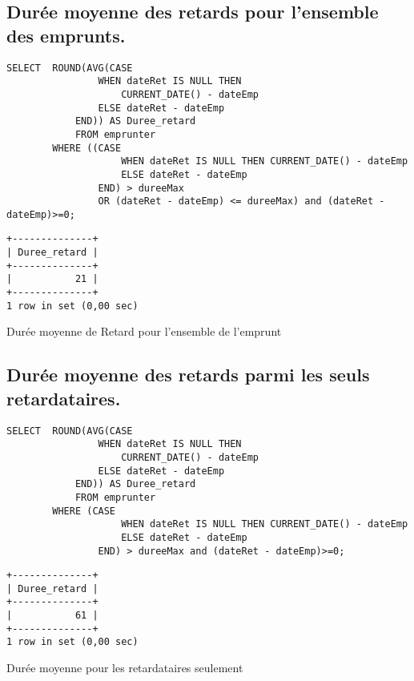 \documentclass{article}
\begin{document}
\subsection{Durée moyenne des retards pour l’ensemble des emprunts.}
\begin{listing}[H]
\begin{verbatim}
SELECT	ROUND(AVG(CASE
				WHEN dateRet IS NULL THEN
					CURRENT_DATE() - dateEmp
				ELSE dateRet - dateEmp
			END)) AS Duree_retard
			FROM emprunter     
		WHERE ((CASE
					WHEN dateRet IS NULL THEN CURRENT_DATE() - dateEmp
					ELSE dateRet - dateEmp
				END) > dureeMax
				OR (dateRet - dateEmp) <= dureeMax) and (dateRet - dateEmp)>=0;
\end{verbatim}
\begin{verbatim}
+--------------+
| Duree_retard |
+--------------+
|           21 |
+--------------+
1 row in set (0,00 sec)
\end{verbatim}
\caption{Durée moyenne de Retard pour l'ensemble de l'emprunt}
\end{listing}
\subsection{Durée moyenne des retards parmi les seuls retardataires.}
\begin{listing}[H]
\begin{verbatim}
SELECT	ROUND(AVG(CASE
				WHEN dateRet IS NULL THEN
					CURRENT_DATE() - dateEmp
				ELSE dateRet - dateEmp
			END)) AS Duree_retard
			FROM emprunter     
		WHERE (CASE
					WHEN dateRet IS NULL THEN CURRENT_DATE() - dateEmp
					ELSE dateRet - dateEmp
				END) > dureeMax and (dateRet - dateEmp)>=0;
\end{verbatim}
\begin{verbatim}
+--------------+
| Duree_retard |
+--------------+
|           61 |
+--------------+
1 row in set (0,00 sec)
\end{verbatim}
\caption{Durée moyenne pour les retardataires seulement}
\end{listing}
\end{document}

